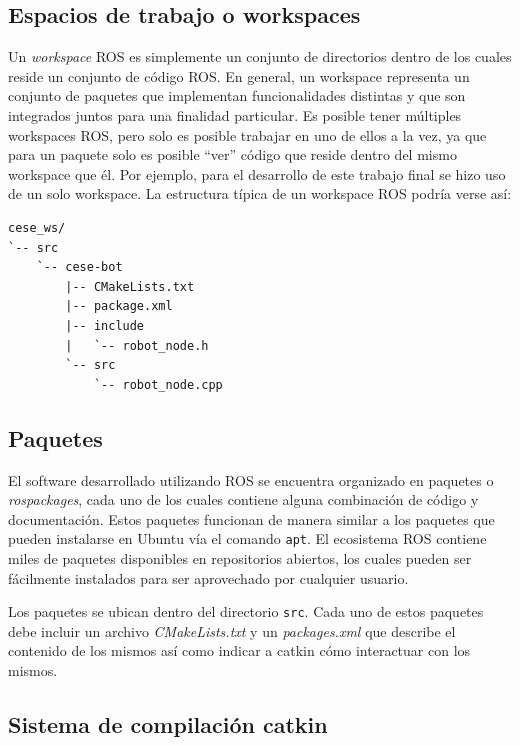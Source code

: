 \subsection{Espacios de trabajo o workspaces}

Un \textit{workspace} ROS es simplemente un conjunto de directorios dentro de los cuales reside un conjunto de código ROS. En general, un workspace representa un conjunto de paquetes que implementan funcionalidades distintas y que son integrados juntos para una finalidad particular. Es posible tener múltiples workspaces ROS, pero solo es posible trabajar en uno de ellos a la vez, ya que para un paquete solo es posible ``ver'' código que reside dentro del mismo workspace que él. Por ejemplo, para el desarrollo de este trabajo final se hizo uso de un solo workspace. La estructura típica de un workspace ROS podría verse así:

\begin{lstlisting}[basicstyle=\ttfamily, keywords={}]
cese_ws/
`-- src
    `-- cese-bot
        |-- CMakeLists.txt
        |-- package.xml
        |-- include
        |   `-- robot_node.h
        `-- src
            `-- robot_node.cpp
\end{lstlisting}




\subsection{Paquetes}

El software desarrollado utilizando ROS se encuentra organizado en paquetes o \textit{rospackages}, cada uno de los cuales contiene alguna combinación de código y documentación. Estos paquetes funcionan de manera similar a los paquetes que pueden instalarse en Ubuntu vía el comando \texttt{apt}. El ecosistema ROS contiene miles de paquetes disponibles en repositorios abiertos, los cuales pueden ser fácilmente instalados para ser aprovechado por cualquier usuario.

Los paquetes se ubican dentro del directorio \texttt{src}. Cada uno de estos paquetes debe incluir un archivo \textit{CMakeLists.txt} y un \textit{packages.xml} que describe el contenido de los mismos así como indicar a catkin cómo interactuar con los mismos.

\subsection{Sistema de compilación catkin}

